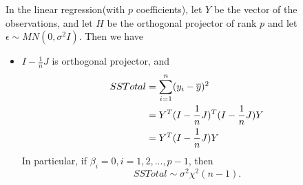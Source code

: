\begin{refsection}
\begin{theorem}\label{ch:theory-of-statistics:th:variancedecompositionlinearregression}\cite[76]{montgomery2012introduction}
	In the linear regression(with $p$ coefficients), let $Y$ be the vector of the observations, and let $H$ be the orthogonal projector of rank $p$ and let $\epsilon \sim MN(0,\sigma^2 I)$. Then we have
	\begin{itemize}
		\item $I-\frac{1}{n}J$ is orthogonal projector, and 
		\begin{align*}
		SSTotal &= \sum_{i=1}^{n} (y_i - \overline{y})^2 \\
		&= Y^T(I-\frac{1}{n}J)^T(I-\frac{1}{n}J)Y\\
		&=Y^T(I-\frac{1}{n}J)Y
		\end{align*}
	In particular, if $\beta_i = 0,i=1,2,...,p-1$, then
	$$SSTotal \sim \sigma^2 \chi^2(n-1).$$	
		

\end{itemize}
\end{theorem}
\end{refsection}
